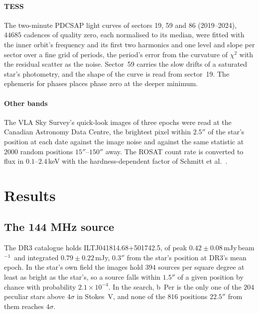 \documentclass[3p,11pt]{elsarticle}
\newcommand{\mJyb}{mJy\,beam$^{-1}$}
\newcommand{\sci}[2]{#1\times10^{#2}}
\begin{document}
\paragraph{TESS} The two-minute PDCSAP light curves of sectors 19, 59 and 86
(2019--2024), $44685$ cadences of quality zero, each normalised to its median, were
fitted with the inner orbit's frequency and its first two harmonics and one level and
slope per sector over a fine grid of periods, the period's error from the curvature of
$\chi^2$ with the residual scatter as the noise. Sector~59 carries the slow drifts of a
saturated star's photometry, and the shape of the curve is read from sector~19. The
ephemeris for phases places phase zero at the deeper minimum.

\paragraph{Other bands} The VLA Sky Survey's quick-look images of three epochs were
read at the Canadian Astronomy Data Centre, the brightest pixel within $2.5''$ of the
star's position at each date against the image noise and against the same statistic at
$2000$ random positions $15''$--$150''$ away. The ROSAT count rate is converted to flux
in $0.1$--$2.4$\,keV with the hardness-dependent factor of Schmitt et
al.~\cite{Schmitt1995}.

\section{Results}\label{sec:results}

\subsection{The 144 MHz source}

The DR3 catalogue holds ILTJ041814.68+501742.5, of peak $0.42\pm0.08$\,\mJyb\ and
integrated $0.79\pm0.22$\,mJy, $0.3''$ from the star's position at DR3's mean epoch. In
the star's own field the images hold $394$ sources per square degree at least as bright
as the star's, so a source falls within $1.5''$ of a given position by chance with
probability $\sci{2.1}{-4}$. In the search, b~Per is the only one of the $204$ peculiar
stars above $4\sigma$ in Stokes~V, and none of the $816$ positions $22.5''$ from them
reaches $4\sigma$.
\end{document}
